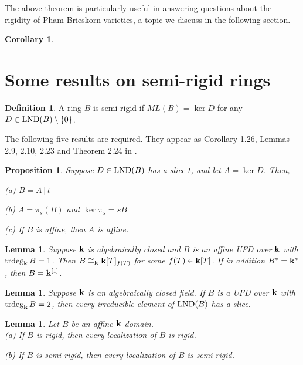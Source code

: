 \documentclass[12pt]{amsart}
\theoremstyle{plain}
\newtheorem{proposition}[subsection]{Proposition}
\newtheorem{lemma}[subsection]{Lemma}
\newtheorem{corollary}[subsection]{Corollary}
\theoremstyle{definition}
\newtheorem{definition}[subsection]{Definition}
\newcommand{\trdeg}{	\operatorname{{\rm trdeg}}}
\newcommand{\bk}{{\ensuremath{\rm \bf k}}}
\newcommand{\lnd}{\operatorname{{\rm LND}}}
\newcommand{\isom}{\cong}
\begin{document}
The above theorem is particularly useful in answering questions about the rigidity of Pham-Brieskorn varieties, a topic we discuss in the following section. 

\begin{corollary}
	
\end{corollary}

\section{Some results on semi-rigid rings}

\begin{definition}
	A ring $B$ is semi-rigid if $ML(B) = \ker D$ for any $D \in \lnd(B) \setminus\{0\}$. 
\end{definition}

The following five results are required. They appear as Corollary 1.26, Lemmas 2.9, 2.10, 2.23 and Theorem 2.24 in \cite{freudenburg2017algebraic}.

\begin{proposition}\label{sliceTheorem}
	Suppose $D \in \lnd(B)$ has a slice $t$, and let $A = \ker D$. Then,
	
	(a) $B = A[t]$
	
	(b) $A = \pi_s(B)$ and $\ker \pi_s = sB$
	
	(c) If $B$ is affine, then $A$ is affine. 
	
\end{proposition}

\begin{lemma} \label{FV2-2.9}
	Suppose $\bk$ is algebraically closed and $B$ is an affine UFD over $\bk$ with $\trdeg_\bk B = 1$. Then $B \isom_\bk \bk[T]_{f(T)}$ for some $f(T) \in \bk[T]$. If in addition $B^* = \bk^*$, then $B = \bk^{[1]}$. 
\end{lemma}


\begin{lemma}\label{FV2-2.10}
	Suppose $\bk$ is an algebraically closed field. If $B$ is a UFD over $\bk$ with $\trdeg_\bk B = 2$, then every irreducible element of $\lnd(B)$ has a slice. 
\end{lemma}

\begin{lemma} \label{rigidLocalization}
	Let $B$ be an affine $\bk$-domain. 
	\\
	
	(a) If $B$ is rigid, then every localization of $B$ is rigid. 
	
	(b) If $B$ is semi-rigid, then every localization of $B$ is semi-rigid. 
\end{lemma}
\end{document}
